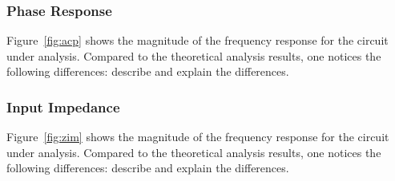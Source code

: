 \lipsum[1-1]

\subsubsection{Phase Response}

Figure~\ref{fig:acp} shows the magnitude of the frequency response for the
circuit under analysis. Compared to the theoretical analysis results, one
notices the following differences: describe and explain the differences.


\lipsum[1-1]

\subsubsection{Input Impedance}

Figure~\ref{fig:zim} shows the magnitude of the frequency response for the
circuit under analysis. Compared to the theoretical analysis results, one
notices the following differences: describe and explain the differences.


\lipsum[1-1]



